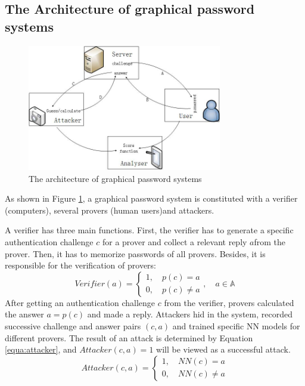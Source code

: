 \documentclass{article}
\begin{document}
  \subsection{The Architecture of graphical password systems}
  \begin{figure}[htb]
    \centering
    \includegraphics[width=8.5cm]{architecture.jpg}
    \caption{The architecture of graphical password systems}
    \label{fig:architecture}
  \end{figure}
  As shown in Figure \ref{fig:architecture}, a graphical password system is constituted with a verifier (computers), 
  several provers (human users)and attackers. 
  
  A verifier has three main functions. First, the verifier has to generate a specific authentication challenge $c$ for 
  a prover and collect a relevant reply $a$from the prover. Then, it has to memorize passwords of all provers. 
  Besides, it is responsible for the verification of provers:
  \begin{equation}
    Verifier(a)=
  \left\{
   \begin{aligned}
   1, \quad p(c) = a \\
   0, \quad p(c) \neq a
   \end{aligned}
   \right.
   , \quad a \in \mathbb{A}
  \end{equation}
  After getting an authentication challenge $c$ from the verifier, provers calculated the answer $a = p(c)$ 
  and made a reply. Attackers hid in the system, recorded successive challenge and answer pairs $(c, a)$ and trained specific 
  NN models for different provers. The result of an attack is determined by Equation \ref{equa:attacker}, 
  and $Attacker(c,a)=1$ will be viewed as a successful attack.
  \begin{equation}
    Attacker(c, a)=
  \left\{
   \begin{aligned}
   1, \quad NN(c) = a \\
   0, \quad NN(c) \neq a
   \end{aligned}
   \right.
  \label{equa:attacker}
  \end{equation}
  
\end{document}
